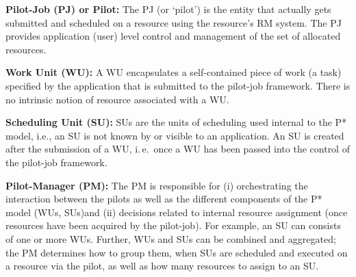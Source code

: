 \documentclass[conference,final]{IEEEtran}
\makeatletter
\def\blueuwave{\bgroup \markoverwith{\lower3.5\p@\hbox{\sixly \textcolor{blue}{\char58}}}\ULon}
\newcommand{\alwave}[1]{ {\blueuwave{#1}}}
\newcommand{\alnote}[1]{ {\textcolor{blue} { ***andre: #1 }}}
\newcommand{\alnote}[1]{}
\makeatother
\begin{document}
\begin{compactitem}

\item \textbf{Pilot-Job (PJ) or Pilot:} The PJ (or `pilot') is the
  entity that actually gets submitted and scheduled on a resource
  using the resource's RM system. The PJ provides application (user)
  level control and management of the set of allocated resources.



\item \textbf{Work Unit (WU):} A WU encapsulates a self-contained
  piece of work (a task) specified by the application that is
  submitted to the pilot-job framework.  There is no intrinsic notion
  of resource associated with a WU.

\item \textbf{Scheduling Unit (SU):} SUs are the units of scheduling
  used internal to the P* model, i.e., an SU is not known by or
  visible to an application. An SU is created after the submission of
  a WU, i.\,e.\ once a WU has been passed into the control of the
  pilot-job framework.

\item \textbf{Pilot-Manager (PM):} The PM is responsible for (i)
  orchestrating the interaction between the pilots as well as the
  different components of the P* model (WUs, SUs)and (ii) decisions
  related to internal resource assignment (once resources have been
  acquired by the pilot-job).  For example, an SU can consists of one
  or more WUs. Further, WUs and SUs can be combined and aggregated;
  the PM determines how to group them, when SUs are scheduled and
  executed on a resource via the pilot, as well as how many resources
  to assign to an SU.



\end{compactitem}
\end{document}
